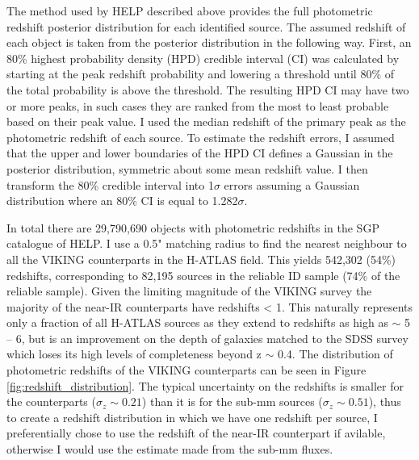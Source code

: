 The method used by HELP described above provides the full photometric redshift posterior distribution for each identified source. The assumed redshift of each object is taken from the posterior distribution in the following way. First, an 80\% highest probability density (HPD) credible interval (CI) was calculated by starting at the peak redshift probability and lowering a threshold until 80\% of the total probability is above the threshold. The resulting HPD CI may have two or more peaks, in such cases they are ranked from the most to least probable based on their peak value. I used the median redshift of the primary peak as the photometric redshift of each source. To estimate the redshift errors, I assumed that the upper and lower boundaries of the HPD CI defines a Gaussian in the posterior distribution, symmetric about some mean redshift value. I then transform the 80\% credible interval into 1$\sigma$ errors assuming a Gaussian distribution where an 80\% CI is equal to 1.282$\sigma$.

In total there are 29,790,690 objects with photometric redshifts in the SGP catalogue of HELP. I use a 0.5" matching radius to find the nearest neighbour to all the VIKING counterparts in the H-ATLAS field. This yields 542,302 (54\%) redshifts, corresponding to 82,195 sources in the reliable ID sample (74\% of the reliable sample). Given the limiting magnitude of the VIKING survey the majority of the near-IR counterparts have redshifts < 1. This naturally represents only a fraction of all H-ATLAS sources as they extend to redshifts as high as $\sim$ 5 -- 6, but is an improvement on the depth of galaxies matched to the SDSS survey which loses its high levels of completeness beyond z $\sim$ 0.4. The distribution of photometric redshifts of the VIKING counterparts can be seen in Figure \ref{fig:redshift_distribution}. The typical uncertainty on the redshifts is smaller for the counterparts ($\sigma_z \sim 0.21$) than it is for the sub-mm sources ($\sigma_z \sim 0.51$), thus to create a redshift distribution in which we have one redshift per source, I preferentially chose to use the redshift of the near-IR counterpart if avilable, otherwise I would use the estimate made from the sub-mm fluxes.


